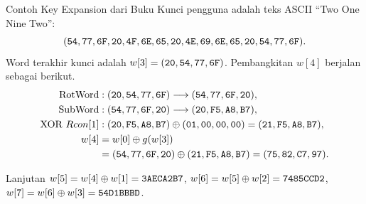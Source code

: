 \documentclass[aspectratio=169,11pt]{beamer}
\begin{document}
\begin{frame}{Contoh Key Expansion dari Buku}
    \footnotesize
    Kunci pengguna adalah teks ASCII ``Two One Nine Two'':
    \[
        (\texttt{54},\texttt{77},\texttt{6F},\texttt{20},\texttt{4F},\texttt{6E},
        \texttt{65},\texttt{20},\texttt{4E},\texttt{69},\texttt{6E},\texttt{65},
        \texttt{20},\texttt{54},\texttt{77},\texttt{6F}).
    \]
    Word terakhir kunci adalah $w[3] = (\texttt{20},\texttt{54},\texttt{77},
    \texttt{6F})$. Pembangkitan $w[4]$ berjalan sebagai berikut.
    \vspace{0.05cm}
    \begin{align*}
        \text{RotWord} &: (\texttt{20},\texttt{54},\texttt{77},\texttt{6F})
        \longrightarrow (\texttt{54},\texttt{77},\texttt{6F},\texttt{20}), \\
        \text{SubWord} &: (\texttt{54},\texttt{77},\texttt{6F},\texttt{20})
        \longrightarrow (\texttt{20},\texttt{F5},\texttt{A8},\texttt{B7}), \\
        \text{XOR } Rcon[1] &: (\texttt{20},\texttt{F5},\texttt{A8},\texttt{B7})
        \oplus (\texttt{01},\texttt{00},\texttt{00},\texttt{00})
        = (\texttt{21},\texttt{F5},\texttt{A8},\texttt{B7}), \\
        w[4] &= w[0] \oplus g(w[3]) \\
        &= (\texttt{54},\texttt{77},\texttt{6F},\texttt{20})
        \oplus (\texttt{21},\texttt{F5},\texttt{A8},\texttt{B7})
        = (\texttt{75},\texttt{82},\texttt{C7},\texttt{97}).
    \end{align*}
    \vspace{-0.1cm}
    \begin{exampleblock}{Lanjutan}
        \scriptsize
        $w[5] = w[4] \oplus w[1] = \texttt{3AECA2B7}$,\quad
        $w[6] = w[5] \oplus w[2] = \texttt{7485CCD2}$,\quad
        $w[7] = w[6] \oplus w[3] = \texttt{54D1BBBD}$.
    \end{exampleblock}
\end{frame}
\end{document}
